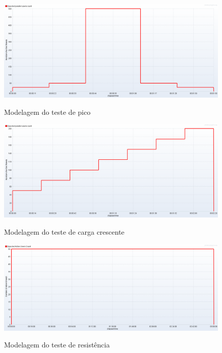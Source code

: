 \documentclass{libs/ufc_format}
\begin{document}
\begin{frame}{}
    \begin{figure}[H]
        \centering
        \caption{Modelagem do teste de pico}
        \includegraphics[width=1\linewidth]{figuras/model-spike1-v2.pdf}
        \captionsetup{justification=centering}
        \label{fig:model-spike1}
    \end{figure}
\end{frame}

\begin{frame}{}
    \begin{figure}[H]
        \centering
        \caption{Modelagem do teste de carga crescente}
        \includegraphics[width=1\linewidth]{figuras/model-crescente-v2.pdf}
        \captionsetup{justification=centering}
        \label{fig:model-crescente}
    \end{figure}
\end{frame}

\begin{frame}{}
    \begin{figure}[H]
        \centering
        \caption{Modelagem do teste de resistência}
        \includegraphics[width=1\linewidth]{figuras/model-endurance-v2.pdf}
        \captionsetup{justification=centering}
        \label{fig:model-endurance}
    \end{figure}
\end{frame}
\end{document}
